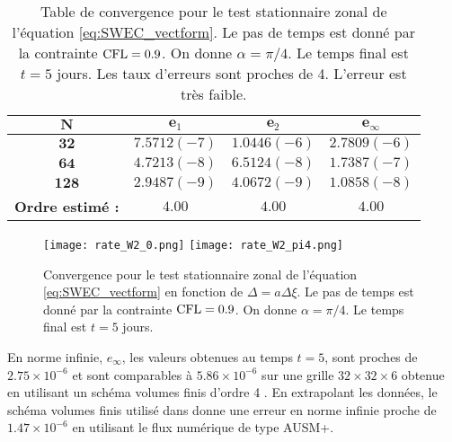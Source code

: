 \begin{table}[htbp]
\begin{center}
\begin{tabular}{|c||c|c|c|}
\hline 
$\mathbf{N}$ & $\mathbf{e}_1$ & $\mathbf{e}_2$ & $\mathbf{e}_{\infty}$ \\ 
\hline 
\hline 
$\mathbf{32}$ & $7.5712(-7)$ & $1.0446(-6)$ & $2.7809(-6)$\\ 

$\mathbf{64}$ & $4.7213(-8)$ & $6.5124(-8)$ & $1.7387(-7)$\\ 

$\mathbf{128}$ & $2.9487(-9)$ & $4.0672(-9)$ & $1.0858(-8)$\\

\hline
\textbf{Ordre estimé :} & $4.00$ & $4.00$ & $4.00$\\ 
\hline
\end{tabular} 
\end{center}
\caption{Table de convergence pour le test stationnaire zonal de l'équation \eqref{eq:SWEC_vectform}. Le pas de temps est donné par la contrainte $\text{CFL}=0.9$. On donne $\alpha = \pi/4$. Le temps final est $t=5$ jours. Les taux d'erreurs sont proches de 4. L'erreur est très faible.}
\label{tab:rate_swe2}
\end{table}

\begin{figure}[htbp]
\begin{center}
\texttt{[image: rate\_W2\_0.png]}
\texttt{[image: rate\_W2\_pi4.png]}
\end{center}
\caption{Convergence pour le test stationnaire zonal de l'équation \eqref{eq:SWEC_vectform} en fonction de $\Delta = a \Delta \xi$. Le pas de temps est donné par la contrainte $\text{CFL}=0.9$. On donne $\alpha = \pi/4$. Le temps final est $t=5$ jours.}
\label{fig:rate_swe12}
\end{figure}

En norme infinie, $e_{\infty}$, les valeurs obtenues au temps $t=5$, sont proches de $2.75 \times 10^{-6}$ et sont comparables à $5.86 \times 10^{-6}$ sur une grille $32 \times 32 \times 6$ obtenue en utilisant un schéma volumes finis d'ordre 4 \cite{Chen2008}. En extrapolant les données, le schéma volumes finis utilisé dans \cite{Ullrich2011} donne une erreur en norme infinie proche de $1.47 \times 10^{-6}$ en utilisant le flux numérique de type AUSM+.

















